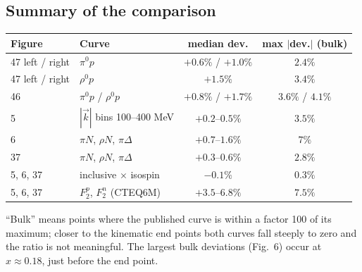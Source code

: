 \documentclass[11pt,a4paper]{article}
\begin{document}
\subsection{Summary of the comparison}
\label{sec:kbin-notes}

\begin{center}
\begin{tabular}{llcc}
\toprule
\textbf{Figure} & \textbf{Curve} & \textbf{median dev.} & \textbf{max $|$dev.$|$ (bulk)} \\
\midrule
47 left / right & $\pi^0p$          & $+0.6\%$ / $+1.0\%$ & $2.4\%$ \\
47 left / right & $\rho^0p$         & $+1.5\%$            & $3.4\%$ \\
46              & $\pi^0p$ / $\rho^0p$ & $+0.8\%$ / $+1.7\%$ & $3.6\%$ / $4.1\%$ \\
5               & $|\vec k|$ bins 100--400 MeV & $+0.2$--$0.5\%$ & $3.5\%$ \\
6               & $\pi N$, $\rho N$, $\pi\Delta$ & $+0.7$--$1.6\%$ & $7\%$ \\
37              & $\pi N$, $\rho N$, $\pi\Delta$ & $+0.3$--$0.6\%$ & $2.8\%$ \\
5, 6, 37        & inclusive $\times$ isospin & $-0.1\%$ & $0.3\%$ \\
5, 6, 37        & $F_2^p$, $F_2^n$ (CTEQ6M) & $+3.5$--$6.8\%$ & $7.5\%$ \\
\bottomrule
\end{tabular}
\end{center}
``Bulk'' means points where the published curve is within a factor 100
of its maximum; closer to the kinematic end points both curves fall
steeply to zero and the ratio is not meaningful.  The largest bulk
deviations (Fig.~6) occur at $x\approx0.18$, just before the end point.
\end{document}
